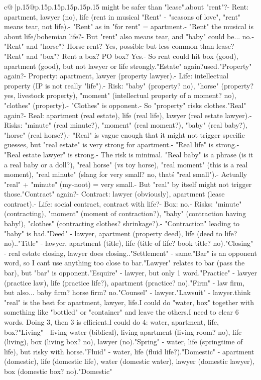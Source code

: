 \documentclass{article}
\begin{document}
{\begin{supertabular}{c@{$\;$}|p{.15\linewidth}@{}p{.15\linewidth}p{.15\linewidth}p{.15\linewidth}p{.15\linewidth}p{.15\linewidth}}
{{{might be safer than "lease".\n\nWhat about "rent"?\n- Rent: apartment, lawyer (no), life (rent in musical "Rent" - "seasons of love", "rent" means tear, not life).\n- "Rent" as in "for rent" = apartment.\n- "Rent" the musical is about life/bohemian life?\n- But "rent" also means tear, and "baby" could be... no.\n- "Rent" and "horse"? Horse rent? Yes, possible but less common than lease?\n- "Rent" and "box"? Rent a box? PO box? Yes.\n- So rent could hit box (good), apartment (good), but not lawyer or life strongly.\n\n"Estate" again?\nAlready used.\n\n"Property" again?\n- Property: apartment, lawyer (property lawyer).\n- Life: intellectual property (IP is not really "life").\n- Risk: "baby" (property? no), "horse" (property? yes, livestock property), "moment" (intellectual property of a moment? no), "clothes" (property).\n- "Clothes" is opponent.\n- So "property" risks clothes.\n\n"Real" again?\n- Real: apartment (real estate), life (real life), lawyer (real estate lawyer).\n- Risks: "minute" (real minute?), "moment" (real moment?), "baby" (real baby?), "horse" (real horse?).\n- "Real" is vague enough that it might not trigger specific guesses, but "real estate" is very strong for apartment.\n- "Real life" is strong.\n- "Real estate lawyer" is strong.\n- The risk is minimal. "Real baby" is a phrase (is it a real baby or a doll?), "real horse" (vs toy horse), "real moment" (this is a real moment), "real minute" (slang for very small? no, that\'s "real small").\n- Actually "real" + "minute" (my-noot) = very small.\n- But "real" by itself might not trigger those.\n\n"Contract" again?\n- Contract: lawyer (obviously), apartment (lease contract).\n- Life: social contract, contract with life?\n- Box: no.\n- Risks: "minute" (contracting), "moment" (moment of contraction?), "baby" (contraction having baby!), "clothes" (contracting clothes? shrinkage?).\n- "Contraction" leading to "baby" is bad.\n\n"Deed" - lawyer, apartment (property deed), life (deed to life? no)..\n\n"Title" - lawyer, apartment (title), life (title of life? book title? no).\n\n"Closing" - real estate closing, lawyer does closing..\n\n"Settlement" - same.\n\n"Bar" is an opponent word, so I can\'t use anything too close to bar.\n"Lawyer" relates to bar (pass the bar), but "bar" is opponent.\n\n"Esquire" - lawyer, but only 1 word.\n\n"Practice" - lawyer (practice law), life (practice life?), apartment (practice? no).\n\n"Firm" - law firm, but also... baby firm? horse firm? no.\n\n"Counsel" - lawyer.\n\n"Lawsuit" - lawyer.\n\nI think "real" is the best for apartment, lawyer, life.\n\nOr I could do "water, box" together with something like "bottled" or "container" and leave the others.\n\nBut I need to clear 6 words. Doing 3, then 3 is efficient.\n\nOr I could do 4: water, apartment, life, box?\n"Living" - living water (biblical), living apartment (living room? no), life (living), box (living box? no), lawyer (no).\n\n"Spring" - water, life (springtime of life), but risky with horse.\n\n"Fluid" - water, life (fluid life?).\n\n"Domestic" - apartment (domestic), life (domestic life), water (domestic water), lawyer (domestic lawyer), box (domestic box? no).\n"Domestic" }}}
\end{supertabular}}
\end{document}
